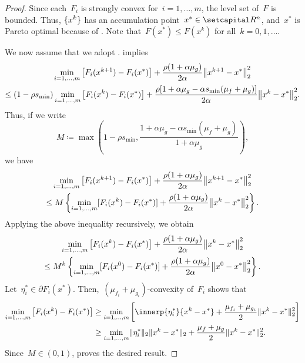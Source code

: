 \documentclass[../../main]{subfiles}
\begin{document}
\begin{proof}
    Since each~$F_i$ is strongly convex for~$i = 1, \dots, m$, the level set of~$F$ is bounded.
    Thus, $\lbrace x^k\rbrace$ has an accumulation point~$x^* \in \setR^n$, and~$x^*$ is Pareto optimal because of .
    Note that~$F(x^*) \le F(x^k)$ for all~$k = 0, 1, \dots$.

    We now assume that we adopt .
     implies
    \begin{multline}
        \min_{i = 1, \dots, m} \left[F_i(x^{k + 1}) - F_i(x^*)\right] + \frac{\rho (1 + \alpha \mu_g)}{2 \alpha} \norm*{x^{k + 1} - x^*}_2^2 \\
        \le (1 - \rho s_{\min}) \min_{i = 1, \dots, m} \left[F_i(x^k) - F_i(x^*)\right] + \frac{\rho [1 + \alpha \mu_g - \alpha s_{\min} (\mu_f + \mu_g)]}{2 \alpha} \norm*{x^k - x^*}_2^2
    .\end{multline}
    Thus, if we write
    \begin{equation}
        M \coloneqq \max \left( 1 - \rho s_{\min}, \frac{1 + \alpha \mu_g - \alpha s_{\min} (\mu_f + \mu_g)}{1 + \alpha \mu_g} \right) 
    ,\end{equation}
    we have
    \begin{multline}
        \min_{i = 1, \dots, m} \left[F_i(x^{k + 1}) - F_i(x^*)\right] + \frac{\rho (1 + \alpha \mu_g)}{2 \alpha} \norm*{x^{k + 1} - x^*}_2^2 \\
        \le M \left\{ \min_{i = 1, \dots, m} [F_i(x^k) - F_i(x^*)] + \frac{\rho (1 + \alpha \mu_g)}{2 \alpha} \norm*{x^k - x^*}_2^2 \right\}  
    .\end{multline}
    Applying the above inequality recursively, we obtain
    \begin{multline} \label{eq:pgm_linear_convergence_sc:rec}
        \min_{i = 1, \dots, m} \left[F_i(x^k) - F_i(x^*)\right] + \frac{\rho (1 + \alpha \mu_g)}{2 \alpha} \norm*{x^k - x^*}_2^2 \\
        \le M^k \left\{ \min_{i = 1, \dots, m} [F_i(x^0) - F_i(x^*)] + \frac{\rho (1 + \alpha \mu_g)}{2 \alpha} \norm*{x^0 - x^*}_2^2 \right\}  
    .\end{multline}
    Let~$\eta_i^* \in \partial F_i(x^*)$.
    Then,~$(\mu_{f_i} + \mu_{g_i})$-convexity of~$F_i$ shows that
    \begin{equation} \label{eq:pgm_linear_convergence_sc:sc}
        \begin{aligned}
            \min_{i = 1, \dots, m} \left[ F_i(x^k) - F_i(x^*) \right] &\ge \min_{i = 1, \dots, m} \left[  \innerp{\eta_i^*}{x^k - x^*} + \frac{\mu_{f_i} + \mu_{g_i}}{2} \norm{x^k - x^*}_2^2 \right] \\
                                                                      &\ge \min_{i = 1, \dots, m} \norm{\eta_i^*}_2 \norm{x^k - x^*}_2 + \frac{\mu_f + \mu_g}{2} \norm{x^k - x^*}_2^2
        .\end{aligned}
    \end{equation}
    Since~$M \in (0, 1)$,  proves the desired result.


\end{proof}
\end{document}
